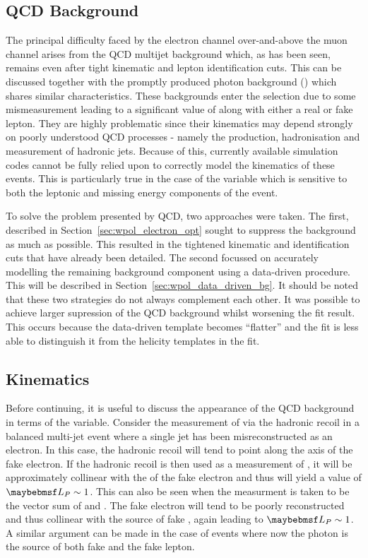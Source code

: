\subsection{\ac{QCD} Background}
The principal difficulty faced by the electron channel over-and-above the muon
channel arises from the \ac{QCD} multijet background which, as has been seen,
remains even after tight kinematic and lepton identification cuts. This can be
discussed together with the promptly produced photon background (\gammajets)
which shares similar characteristics. These backgrounds enter the selection due
to some mismeasurement leading to a significant value of \PtW along with either
a real or fake lepton. They are highly problematic since their kinematics may
depend strongly on poorly understood \ac{QCD} processes - namely the production,
hadronisation and measurement of hadronic jets. Because of this, currently
available simulation codes cannot be fully relied upon to correctly model the
kinematics of these events. This is particularly true in the case of the \LP
variable which is sensitive to both the leptonic and missing energy components
of the event.

To solve the problem presented by \ac{QCD}, two approaches were taken. The
first, described in Section~\ref{sec:wpol_electron_opt} sought to suppress the
background as much as possible. This resulted in the tightened kinematic and
identification cuts that have already been detailed. The second focussed on
accurately modelling the remaining background component using a data-driven
procedure. This will be described in Section~\ref{sec:wpol_data_driven_bg}. It
should be noted that these two strategies do not always complement each
other. It was possible to achieve larger supression of the \ac{QCD} background
whilst worsening the fit result. This occurs because the data-driven template
becomes ``flatter'' and the fit is less able to distinguish it from the helicity
templates in the fit.

\subsection{Kinematics}
Before continuing, it is useful to discuss the appearance of the \ac{QCD}
background in terms of the \LP variable. Consider the
measurement of \PtWv via the hadronic recoil in a balanced multi-jet event where
a single jet has been misreconstructed as an electron. In this case, the
hadronic recoil will tend to point along the axis of the fake electron. If the
hadronic recoil is then used as a measurement of \PtWv, it will be approximately
collinear with the \Ptlv of the fake electron and thus will yield a value of $\LP
\sim 1$. This can also be seen when the \PtW measurment is taken to be the
vector sum of \Ptlv and \METv. The fake electron will tend to be poorly
reconstructed and thus collinear with the source of fake \MET, again leading to
$\LP \sim 1$. A similar argument can be made in the case of \gammajets events
where now the photon is the source of both fake \MET and the fake lepton.


